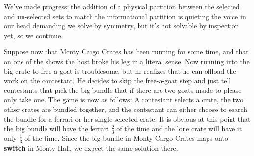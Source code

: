 \documentclass[12pt]{article}
\begin{document}
We've made progress; the addition of a physical partition between the selected and un-selected sets to
match the informational partition is quieting the voice in our head demanding we solve by symmetry, but
it's not solvable by inspection yet, so we continue.

Suppose now that Monty Cargo Crates has been running for some time, and that on one of the shows the
host broke his leg in a literal sense. Now running into the big crate to free a goat is troublesome,
but he realizes that he can offload the work on the contestant. He decides to skip the free-a-goat
step and just tell contestants that pick the big bundle that if there are two goats inside to please
only take one. The game is now as follows: A contestant selects a crate, the two other crates are 
bundled together, and the contestant can either choose to search the bundle for a ferrari or her
single selected crate. It is obvious at this point that the big bundle will have the ferrari $\frac{2}{3}$ of
the time and the lone crate will have it only $\frac{1}{3}$ of the time. Since the big-bundle in Monty
Cargo Crates maps onto \textbf{switch} in Monty Hall, we expect the same solution there.
\end{document}
